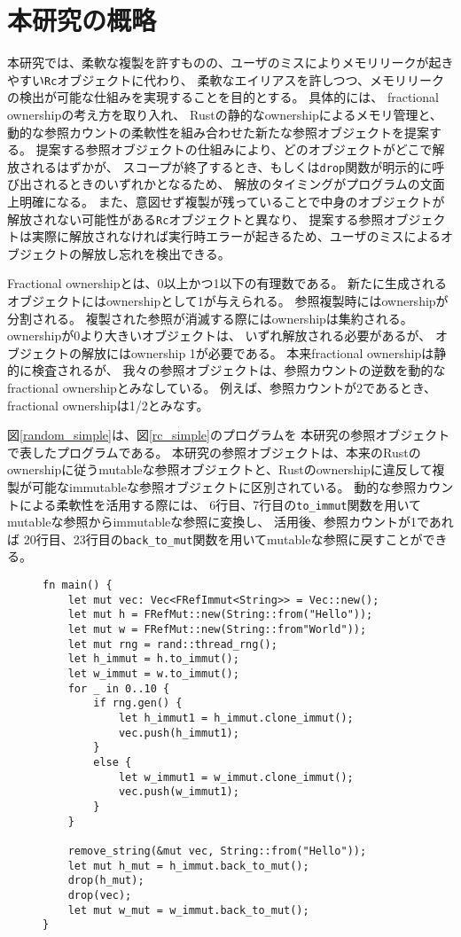 \documentclass{sumiilab-paper}
\theoremstyle{mystyle}
\numberwithin{definition}{chapter} %
\begin{document}
\section{本研究の概略}
本研究では、柔軟な複製を許すものの、ユーザのミスによりメモリリークが起きやすい\texttt{Rc}オブジェクトに代わり、
柔軟なエイリアスを許しつつ、メモリリークの検出が可能な仕組みを実現することを目的とする。
具体的には、
fractional ownership\cite{DBLP:conf/sas/Boyland03}の考え方を取り入れ、
Rustの静的なownershipによるメモリ管理と、
動的な参照カウントの柔軟性を組み合わせた新たな参照オブジェクトを提案する。
提案する参照オブジェクトの仕組みにより、どのオブジェクトがどこで解放されるはずかが、
スコープが終了するとき、もしくは\texttt{drop}関数が明示的に呼び出されるときのいずれかとなるため、
解放のタイミングがプログラムの文面上明確になる。
また、意図せず複製が残っていることで中身のオブジェクトが解放されない可能性がある\texttt{Rc}オブジェクトと異なり、
提案する参照オブジェクトは実際に解放されなければ実行時エラーが起きるため、ユーザのミスによるオブジェクトの解放し忘れを検出できる。

Fractional ownershipとは、0以上かつ1以下の有理数である。
新たに生成されるオブジェクトにはownershipとして1が与えられる。
参照複製時にはownershipが分割される。
複製された参照が消滅する際にはownershipは集約される。
ownershipが0より大きいオブジェクトは、
いずれ解放される必要があるが、
オブジェクトの解放にはownership 1が必要である。
本来fractional ownership\cite{DBLP:conf/sas/Boyland03}は静的に検査されるが、
我々の参照オブジェクトは、参照カウントの逆数を動的なfractional ownershipとみなしている。
例えば、参照カウントが2であるとき、fractional ownershipは1/2とみなす。

図\ref{random_simple}は、図\ref{rc_simple}のプログラムを
本研究の参照オブジェクトで表したプログラムである。
本研究の参照オブジェクトは、本来のRustのownershipに従うmutableな参照オブジェクトと、Rustのownershipに違反して複製が可能なimmutableな参照オブジェクトに区別されている。
動的な参照カウントによる柔軟性を活用する際には、
6行目、7行目の\texttt{to\_immut}関数を用いてmutableな参照からimmutableな参照に変換し、
活用後、参照カウントが1であれば
20行目、23行目の\texttt{back\_to\_mut}関数を用いてmutableな参照に戻すことができる。
\begin{figure}[htp]
\begin{lstlisting}[caption=本研究の方式を用いた具体例, 
  label=random_simple, captionpos=b]
fn main() {
    let mut vec: Vec<FRefImmut<String>> = Vec::new();
    let mut h = FRefMut::new(String::from("Hello"));
    let mut w = FRefMut::new(String::from"World"));
    let mut rng = rand::thread_rng();
    let h_immut = h.to_immut();
    let w_immut = w.to_immut();
    for _ in 0..10 {
        if rng.gen() {
            let h_immut1 = h_immut.clone_immut();
            vec.push(h_immut1);
        }
        else {
            let w_immut1 = w_immut.clone_immut();
            vec.push(w_immut1);
        }
    }

    remove_string(&mut vec, String::from("Hello"));
    let mut h_mut = h_immut.back_to_mut();
    drop(h_mut);
    drop(vec);
    let mut w_mut = w_immut.back_to_mut();
}
\end{lstlisting}
\end{figure}
\end{document}
